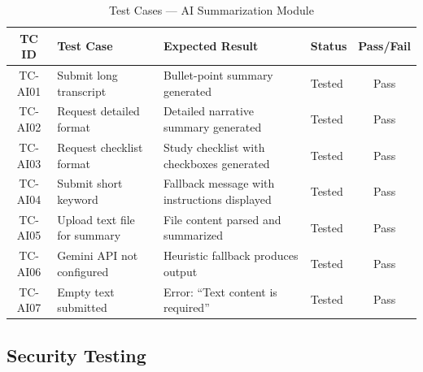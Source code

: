 \begin{table}[H]
\centering
\caption{Test Cases --- AI Summarization Module}
\label{tab:test_ai}
\footnotesize
\begin{tabular}{|c|p{4cm}|p{4cm}|p{2cm}|c|}
\hline
\textbf{TC ID} & \textbf{Test Case} & \textbf{Expected Result} & \textbf{Status} & \textbf{Pass/Fail} \\
\hline
TC-AI01 & Submit long transcript & Bullet-point summary generated & Tested & Pass \\
\hline
TC-AI02 & Request detailed format & Detailed narrative summary generated & Tested & Pass \\
\hline
TC-AI03 & Request checklist format & Study checklist with checkboxes generated & Tested & Pass \\
\hline
TC-AI04 & Submit short keyword & Fallback message with instructions displayed & Tested & Pass \\
\hline
TC-AI05 & Upload text file for summary & File content parsed and summarized & Tested & Pass \\
\hline
TC-AI06 & Gemini API not configured & Heuristic fallback produces output & Tested & Pass \\
\hline
TC-AI07 & Empty text submitted & Error: ``Text content is required'' & Tested & Pass \\
\hline
\end{tabular}
\end{table}

\subsection{Security Testing}

